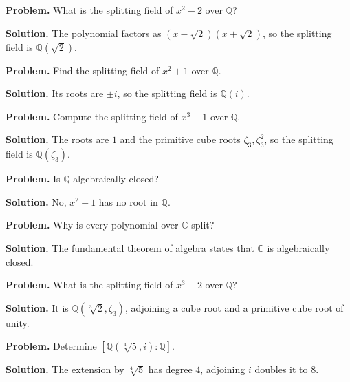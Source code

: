\begin{example}\label{ex:sec3-1}
\textbf{Problem.} What is the splitting field of $x^2-2$ over $\mathbb{Q}$?

\textbf{Solution.} The polynomial factors as $(x-\sqrt{2})(x+\sqrt{2})$, so the splitting field is $\mathbb{Q}(\sqrt{2})$.
\end{example}

\begin{example}\label{ex:sec3-2}
\textbf{Problem.} Find the splitting field of $x^2+1$ over $\mathbb{Q}$.

\textbf{Solution.} Its roots are $\pm i$, so the splitting field is $\mathbb{Q}(i)$.
\end{example}

\begin{example}\label{ex:sec3-3}
\textbf{Problem.} Compute the splitting field of $x^3-1$ over $\mathbb{Q}$.

\textbf{Solution.} The roots are $1$ and the primitive cube roots $\zeta_3,\zeta_3^2$, so the splitting field is $\mathbb{Q}(\zeta_3)$.
\end{example}

\begin{example}\label{ex:sec3-4}
\textbf{Problem.} Is $\mathbb{Q}$ algebraically closed?

\textbf{Solution.} No, $x^2+1$ has no root in $\mathbb{Q}$.
\end{example}

\begin{example}\label{ex:sec3-5}
\textbf{Problem.} Why is every polynomial over $\mathbb{C}$ split?

\textbf{Solution.} The fundamental theorem of algebra states that $\mathbb{C}$ is algebraically closed.
\end{example}

\begin{example}\label{ex:sec3-6}
\textbf{Problem.} What is the splitting field of $x^3-2$ over $\mathbb{Q}$?

\textbf{Solution.} It is $\mathbb{Q}(\sqrt[3]{2},\zeta_3)$, adjoining a cube root and a primitive cube root of unity.
\end{example}

\begin{example}\label{ex:sec3-7}
\textbf{Problem.} Determine $[\mathbb{Q}(\sqrt[4]{5}, i):\mathbb{Q}]$.

\textbf{Solution.} The extension by $\sqrt[4]{5}$ has degree $4$, adjoining $i$ doubles it to $8$.
\end{example}


